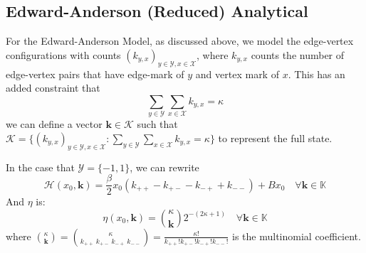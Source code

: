 \documentclass[12pt]{article}
\numberwithin{equation}{section}
\begin{document}
\subsection{Edward-Anderson (Reduced) Analytical}

For the Edward-Anderson Model, as discussed above, we model the edge-vertex configurations with counts $(k_{y, x})_{y\in\mathcal{Y}, x\in\mathcal{X}}$, where $k_{y, x}$ counts the number of edge-vertex pairs that have edge-mark of $y$ and vertex mark of $x$. This has an added constraint that
\begin{equation}
    \sum_{y\in\mathcal{Y}}\sum_{x\in\mathcal{X}} k_{y, x} = \kappa
\end{equation}
we can define a vector $\mathbf{k}\in \mathcal{K}$ such that $\mathcal{K} = \{(k_{y, x})_{y\in\mathcal{Y}, x\in\mathcal{X}} : \sum_{y\in\mathcal{Y}}\sum_{x\in\mathcal{X}} k_{y, x} = \kappa\}$ to represent the full state.

In the case that $\mathcal{Y} = \{-1, 1\}$, we can rewrite
\begin{equation}
    \mathcal{H}(x_0, \mathbf{k}) = \frac\beta2 x_0 (k_{++} - k_{+-} - k_{-+} + k_{--}) + Bx_0 \quad\forall \mathbf{k}\in\mathbb{K}
\end{equation}
And $\eta$ is:
\begin{equation*}
    \eta(x_0, \mathbf{k}) = {\kappa \choose \mathbf{k}} 2^{-(2\kappa+1)} \quad\forall \mathbf{k}\in\mathbb{K}
\end{equation*}
where ${\kappa \choose \mathbf{k}} = {\kappa \choose k_{++}\ k_{+-}\ k_{-+}\ k_{--}} = \frac{\kappa!}{k_{++}!k_{+-}!k_{-+}!k_{--}!}$ is the
multinomial coefficient.
\end{document}
